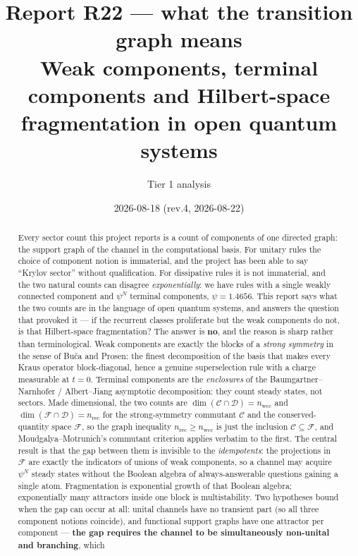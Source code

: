 \documentclass[11pt]{article}
\title{\textbf{Report R22 --- what the transition graph means}\\
\large Weak components, terminal components and Hilbert-space fragmentation
in open quantum systems}
\author{Tier 1 analysis}
\date{2026-08-18 \quad (rev.4, 2026-08-22)}
\theoremstyle{plain}
\theoremstyle{definition}
\theoremstyle{remark}
\begin{document}
\maketitle

\begin{abstract}
Every sector count this project reports is a count of components of one
directed graph: the support graph of the channel in the computational basis.
For unitary rules the choice of component notion is immaterial, and the
project has been able to say ``Krylov sector'' without qualification. For
dissipative rules it is not immaterial, and the two natural counts can
disagree \emph{exponentially}: we have rules with a single weakly connected
component and $\psi^N$ terminal components, $\psi = 1.4656$. This report says
what the two counts are in the language of open quantum systems, and answers
the question that provoked it --- if the recurrent classes proliferate but the
weak components do not, is that Hilbert-space fragmentation? The answer is
\textbf{no}, and the reason is sharp rather than terminological. Weak
components are exactly the blocks of a \emph{strong symmetry} in the sense of
Bu\v{c}a and Prosen: the finest decomposition of the basis that makes every
Kraus operator block-diagonal, hence a genuine superselection rule with a
charge measurable at $t=0$. Terminal components are the \emph{enclosures} of
the Baumgartner--Narnhofer / Albert--Jiang asymptotic decomposition: they count
steady states, not sectors. Made dimensional, the two counts are
$\dim(\mathcal{C}\cap\mathcal{D}) = n_{\mathrm{wcc}}$ and
$\dim(\mathcal{F}\cap\mathcal{D}) = n_{\mathrm{rec}}$ for the strong-symmetry
commutant $\mathcal{C}$ and the conserved-quantity space $\mathcal{F}$, so the
graph inequality $n_{\mathrm{rec}} \ge n_{\mathrm{wcc}}$ is just the inclusion
$\mathcal{C}\subseteq\mathcal{F}$, and Moudgalya--Motrunich's commutant
criterion applies verbatim to the first. The central result is that the gap
between them is invisible to the \emph{idempotents}: the projections in
$\mathcal{F}$ are exactly the indicators of unions of weak components, so a
channel may acquire $\psi^N$ steady states without the Boolean algebra of
always-answerable questions gaining a single atom. Fragmentation is exponential
growth of that Boolean algebra; exponentially many attractors inside one block
is multistability. Two hypotheses bound when the gap can occur at all: unital
channels have no transient part (so all three component notions coincide), and
functional support graphs have one attractor per component --- \textbf{the gap
requires the channel to be simultaneously non-unital and branching}, which

\end{abstract}
\end{document}

